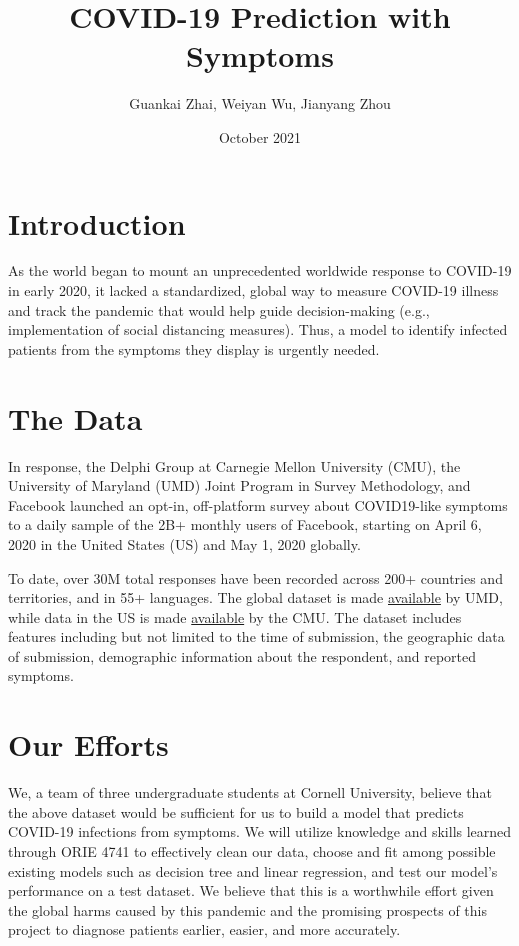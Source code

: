 \documentclass[12pt]{extarticle}
\title{COVID-19 Prediction with Symptoms}
\author{Guankai Zhai, Weiyan Wu, Jianyang Zhou}
\date{October 2021}
\begin{document}
\maketitle

\section*{Introduction}
As the world began to mount an unprecedented worldwide response to COVID-19 in early 2020, it lacked a standardized, global way to measure COVID-19 illness and track the pandemic that would help guide decision-making (e.g., implementation of social distancing measures). Thus, a model to identify infected patients from the symptoms they display is urgently needed. \par

\section*{The Data}

In response, the Delphi Group at Carnegie Mellon University (CMU), the University of Maryland (UMD) Joint Program in Survey Methodology, and Facebook launched an opt-in, off-platform survey about COVID19-like symptoms to a daily sample of the 2B+ monthly users of Facebook, starting on April 6, 2020 in the United States (US) and May 1, 2020 globally. \par

To date, over 30M total responses have been recorded across 200+ countries and territories, and in 55+ languages. The global dataset is made \href{https://gisumd.github.io/COVID-19-API-Documentation/}{available} by UMD, while data in the US is made \href{https://cmu.app.box.com/s/ymnmu3i125go4aue0qxosi3rbcae20bj}{available} by the CMU. The dataset includes features including but not limited to the time of submission, the geographic data of submission, demographic information about the respondent, and reported symptoms.\par

\section*{Our Efforts}
We, a team of three undergraduate students at Cornell University, believe that the above dataset would be sufficient for us to build a model that predicts COVID-19 infections from symptoms. We will utilize knowledge and skills learned through ORIE 4741 to effectively clean our data, choose and fit among possible existing models such as decision tree and linear regression, and test our model's performance on a test dataset. We believe that this is a worthwhile effort given the global harms caused by this pandemic and the promising prospects of this project to diagnose patients earlier, easier, and more accurately.
\end{document}
